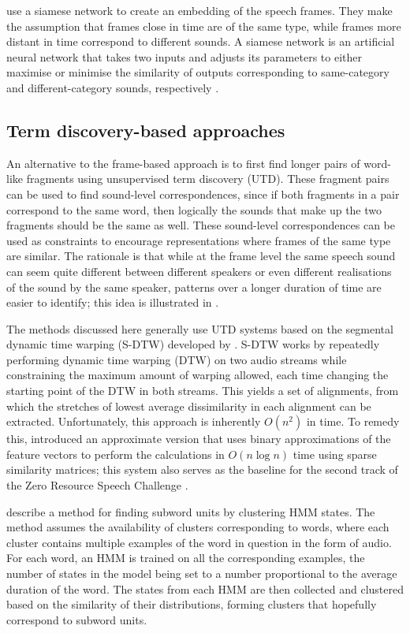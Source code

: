\textcite{synnaeve2016temporal} use a siamese network to create an embedding of the speech frames.
They make the assumption that frames close in time are of the same type, while frames more distant in time correspond to different sounds.
A siamese network is an artificial neural network that takes two inputs and adjusts its parameters to either maximise or minimise the similarity of outputs corresponding to same-category and different-category sounds, respectively \parencite{bromley1994signature}.

\subsection{Term discovery-based approaches}

An alternative to the frame-based approach is to first find longer pairs of word-like fragments using unsupervised term discovery (UTD).
These fragment pairs can be used to find sound-level correspondences, since if both fragments in a pair correspond to the same word, then logically the sounds that make up the two fragments should be the same as well.
These sound-level correspondences can be used as constraints to encourage representations where frames of the same type are similar.
The rationale is that while at the frame level the same speech sound can seem quite different between different speakers or even different realisations of the sound by the same speaker, patterns over a longer duration of time are easier to identify; this idea is illustrated in \textcite{jansen2013weak}.

The methods discussed here generally use UTD systems based on the segmental dynamic time warping (S-DTW) developed by \textcite{park2008unsupervised}.
S-DTW works by repeatedly performing dynamic time warping (DTW) on two audio streams while constraining the maximum amount of warping allowed, each time changing the starting point of the DTW in both streams.
This yields a set of alignments, from which the stretches of lowest average dissimilarity in each alignment can be extracted.
Unfortunately, this approach is inherently $O(n^2)$ in time.
To remedy this, \textcite{jansen2011efficient} introduced an approximate version that uses binary approximations of the feature vectors to perform the calculations in $O(n \log n)$ time using sparse similarity matrices; this system also serves as the baseline for the second track of the Zero Resource Speech Challenge \parencite{versteegh2015zero}.

\textcite{jansen2011towards} describe a method for finding subword units by clustering HMM states.
The method assumes the availability of clusters corresponding to words, where each cluster contains multiple examples of the word in question in the form of audio.
For each word, an HMM is trained on all the corresponding examples, the number of states in the model being set to a number proportional to the average duration of the word.
The states from each HMM are then collected and clustered based on the similarity of their distributions, forming clusters that hopefully correspond to subword units.

